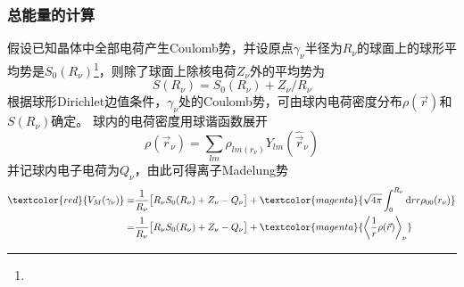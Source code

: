 \frame
{
	\frametitle{总能量的计算}
	假设已知晶体中全部电荷产生\textrm{Coulomb}势，并设原点$\gamma_{\nu}$半径为$R_{\nu}$的球面上的球形平均势是$S_0(R_{\nu})$\footnote{\fontsize{7.2pt}{6.2pt}}，则除了球面上除核电荷$Z_{\nu}$外的平均势为
	\begin{displaymath}
		S(R_{\nu})=S_0(R_{\nu})+Z_{\nu}/R_{\nu}
	\end{displaymath}
	根据球形\textrm{Dirichlet}边值条件，$\gamma_{\nu}$处的\textrm{Coulomb}势，可由球内电荷密度分布$\rho(\vec r)$和$S(R_{\nu})$确定。
	球内的电荷密度用球谐函数展开
	\begin{displaymath}
		\rho(\vec r_{\nu})=\sum_{lm}\rho_{lm(r_{\nu})}Y_{lm}(\hat{\vec r}_{\nu})
	\end{displaymath}
	并记球内电子电荷为$Q_{\nu}$，由此可得离子\textrm{Madelung}势
	\begin{displaymath}
		\begin{aligned}
			\textcolor{red}{V_M(\gamma_{\nu})}=&\dfrac1{R_{\nu}}\big[R_{\nu}S_0(R_{\nu})+Z_{\nu}-Q_{\nu}\big]+\textcolor{magenta}{\sqrt{4\pi}\int_0^{R_{\nu}}\mathrm{d}rr\rho_{00}(r_{\nu})}\\
			=&\dfrac1{R_{\nu}}\big[R_{\nu}S_0(R_{\nu})+Z_{\nu}-Q_{\nu}\big]+\textcolor{magenta}{\left\langle\dfrac1r\rho(\vec r)\right\rangle_{\nu}}
		\end{aligned}
	\end{displaymath}
}

